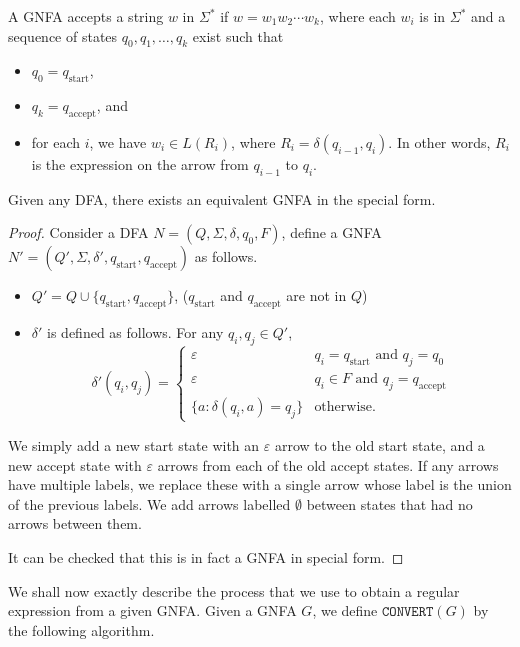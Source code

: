 A GNFA accepts a string $w$ in  $\Sigma^*$ if $w=w_1w_2\cdots w_k$, where each $w_i$ is in $\Sigma^*$  and a sequence of states $q_0,q_1,\ldots,q_k$ exist such that
\begin{itemize}
	\item $q_0=q_{\text{start}}$,
	\item $q_k=q_{\text{accept}}$, and
	\item for each $i$, we have $w_i\in L(R_i)$, where $R_i=\delta(q_{i-1},q_i)$. In other words, $R_i$ is the expression on the arrow from $q_{i-1}$ to $q_i$.
\end{itemize}

\begin{lemma}
\label{DFAtoSpGNFA}
Given any DFA, there exists an equivalent GNFA in the special form.
\end{lemma}
\begin{proof}
Consider a DFA $N=(Q,\Sigma,\delta,q_0,F)$, define a GNFA $N'=(Q',\Sigma,\delta',q_{\text{start}},q_{\text{accept}})$ as follows.
\begin{itemize}
	\item $Q'=Q\cup \{q_\text{start}, q_\text{accept}\}$, ($q_\text{start}$ and $q_\text{accept}$ are not in $Q$)
	\item $\delta'$ is defined as follows. For any $q_i,q_j\in Q'$,
	$$
	\delta'(q_i,q_j)=
	\begin{cases}
	\varepsilon & q_i=q_\text{start}\text{ and }q_j=q_0 \\
	\varepsilon & q_i\in F\text{ and } q_j=q_\text{accept} \\
	\{a: \delta(q_i,a)=q_j\} & \text{otherwise.}
	\end{cases}
	$$
\end{itemize}
	We simply add a new start state with an $\varepsilon$ arrow to the old start state, and a new accept state with $\varepsilon$ arrows from each of the old accept states. If any arrows have multiple labels, we replace these with a single arrow whose label is the union of the previous labels. We add arrows labelled $\emptyset$ between states that had no arrows between them.
	
	It can be checked that this is in fact a GNFA in special form.
\end{proof}

We shall now exactly describe the process that we use to obtain a regular expression from a given GNFA. Given a GNFA $G$, we define $\texttt{CONVERT}(G)$ by the following algorithm.

